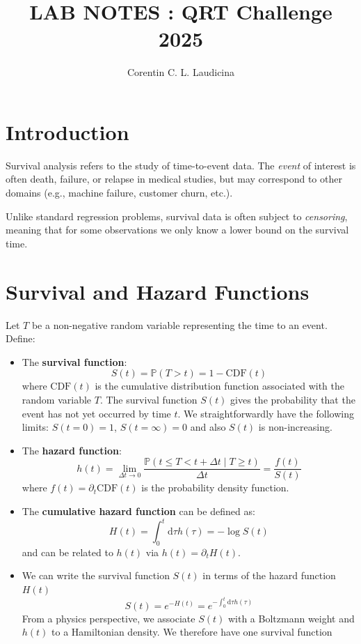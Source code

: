 \documentclass[12pt]{article}
\title{LAB NOTES : QRT Challenge 2025}
\author{Corentin C. L. Laudicina}
\date{}
\begin{document}
\maketitle

\section{Introduction}
Survival analysis refers to the study of time-to-event data. The \textit{event} of interest is often death, failure, or relapse in medical studies, but may correspond to other domains (e.g., machine failure, customer churn, etc.).

Unlike standard regression problems, survival data is often subject to \textit{censoring}, meaning that for some observations we only know a lower bound on the survival time.

\section{Survival and Hazard Functions}

Let $ T $ be a non-negative random variable representing the time to an event. Define:

\begin{itemize}

  \item The \textbf{survival function}:
  \begin{equation}
    S(t) = \mathbb{P}(T > t) = 1 - \mathrm{CDF}(t)
  \end{equation}
  where $\mathrm{CDF}(t)$ is the cumulative distribution function associated with the random variable $T$. The survival function $S(t)$ gives the probability that the event has not yet occurred by time $t$. We straightforwardly have the following limits: $S(t=0) = 1$, $S(t=\infty) = 0$ and also $S(t)$ is non-increasing. 
  \item The \textbf{hazard function}:
  \begin{equation}
    h(t) = \lim_{\Delta t \to 0} \frac{\mathbb{P}(t \leq T < t + \Delta t \mid T \geq t)}{\Delta t} = \frac{f(t)}{S(t)}
  \end{equation}
  where $f(t)= \partial_t \mathrm{CDF}(t)$ is the probability density function.
  \item The \textbf{cumulative hazard function} can be defined as:
  \begin{equation}
    H(t) = \int_0^t \mathrm{d}\tau h(\tau) = -\log S(t)
  \end{equation}
 and can be related to $h(t)$ via $h(t) = \partial_t H(t)$. 
  \item We can write the survival function $S(t)$ in terms of the hazard function $H(t)$
		\begin{equation}
			S(t) = e^{-H(t)} = e^{-\int_0^t\mathrm{d}\tau h(\tau)}
		\end{equation}
	From a physics perspective, we associate $S(t)$ with a Boltzmann weight and $h(t)$ to a Hamiltonian density. We therefore have one survival function 
\end{itemize}
\end{document}
